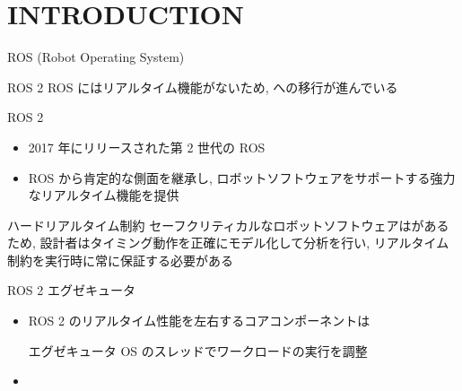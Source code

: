 
\section{INTRODUCTION}
\label{sec: introduction}

\begin{frame}{ROS (Robot Operating System)}
\end{frame}

\begin{frame}{ROS 2}
    ROS にはリアルタイム機能がないため, への移行が進んでいる
    \begin{block}{ROS 2}
        \begin{itemize}
            \item 2017 年にリリースされた第 2 世代の ROS
            \item ROS から肯定的な側面を継承し, ロボットソフトウェアをサポートする強力なリアルタイム機能を提供
        \end{itemize}
    \end{block}
\end{frame}

\begin{frame}{ハードリアルタイム制約}
    セーフクリティカルなロボットソフトウェアはがあるため, 設計者はタイミング動作を正確にモデル化して分析を行い, リアルタイム制約を実行時に常に保証する必要がある
\end{frame}

\begin{frame}{ROS 2 エグゼキュータ}
    \begin{itemize}
        \item ROS 2 のリアルタイム性能を左右するコアコンポーネントは
        \begin{block}{エグゼキュータ}
            OS のスレッドでワークロードの実行を調整
        \end{block}
        \vspace{5mm}
        \item {}
    \end{itemize}
\end{frame}

